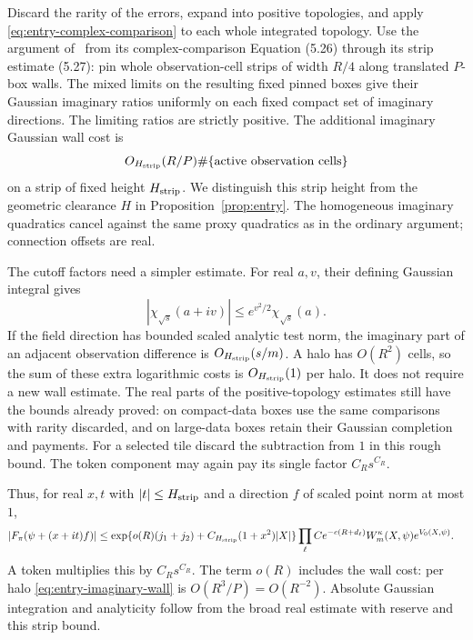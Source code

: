 Discard the rarity of the errors, expand into positive topologies,
and apply \eqref{eq:entry-complex-comparison} to each whole integrated
topology. Use the argument of~\cite{X} from its complex-comparison
Equation (5.26) through its
strip estimate (5.27): pin whole observation-cell
strips of width $R/4$ along translated $P$-box walls. The mixed
limits on the resulting fixed pinned boxes give their Gaussian
imaginary ratios uniformly on each fixed compact set of imaginary
directions. The limiting ratios are strictly positive. The additional
imaginary Gaussian wall cost is
\begin{equation}\label{eq:entry-imaginary-wall}
          O_{H_{\rm strip}}(R/P)
                    \#\{\text{active observation cells}\}
\end{equation}
on a strip of fixed height $H_{\rm strip}$. We distinguish this
strip height from the geometric clearance $H$ in
Proposition~\ref{prop:entry}. The homogeneous imaginary quadratics
cancel against the same proxy quadratics as in the ordinary argument;
connection offsets are real.

The cutoff factors need a simpler estimate. For real $a,v$, their
defining Gaussian integral gives
\begin{equation}\label{eq:entry-complex-cutoff}
                 |\chi_{\sqrt{s}}(a+iv)|
                     \le e^{v^2/2}\chi_{\sqrt{s}}(a).
\end{equation}
If the field direction has bounded scaled analytic test norm, the
imaginary part of an adjacent observation difference is
$O_{H_{\rm strip}}(s/m)$. A halo has $O(R^2)$ cells, so the sum of
these extra logarithmic costs is $O_{H_{\rm strip}}(1)$ per halo.
It does not require a new wall estimate. The real parts of the
positive-topology estimates still have the bounds already proved:
on compact-data boxes use the same comparisons with rarity discarded,
and on large-data boxes retain their Gaussian completion and payments.
For a selected tile discard the subtraction from $1$ in this rough
bound. The token component may again pay its single factor
$C_Rs^{C_R}$.

Thus, for real $x,t$ with $|t|\le H_{\rm strip}$ and a direction
$f$ of scaled point norm at most $1$,
\begin{align}\label{eq:entry-rough-strip}
 |F_\pi(\psi+(x+it)f)|
 &\le
 \exp\{o(R)(j_1+j_2)+C_{H_{\rm strip}}(1+x^2)|X|\}
      \prod_\ell Ce^{-c(R+d_\ell)}
                      W_m^\kappa(X,\psi)e^{V_0(X,\psi)}.
\end{align}
A token multiplies this by $C_Rs^{C_R}$. The term $o(R)$ includes
the wall cost: per halo \eqref{eq:entry-imaginary-wall} is
$O(R^3/P)=O(R^{-2})$. Absolute Gaussian integration and analyticity
follow from the broad real estimate with reserve and this strip bound.

